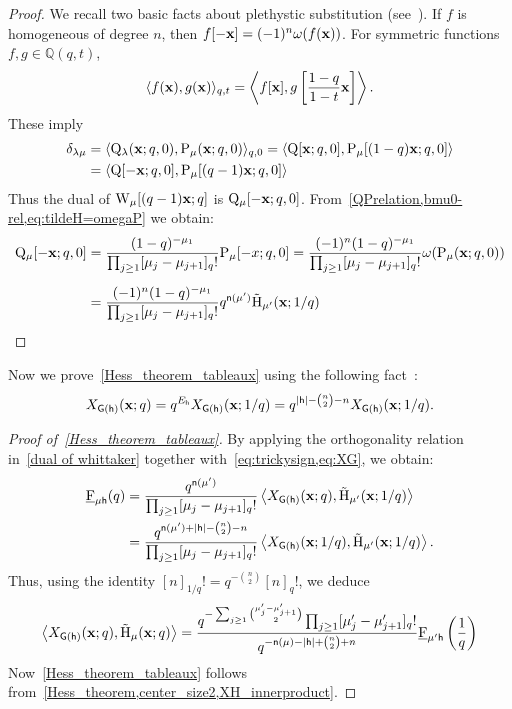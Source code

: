 \documentclass[12pt,a4paper,reqno]{amsart}
\theoremstyle{plain}
\theoremstyle{definition}
\newcommand{\1}{\mathds{1}}
\renewcommand{\P}{\mathrm{P}}
\newcommand{\F}{\mathrm{F}}
\newcommand{\HH}{\mathrm{H}}
\newcommand{\Q}{\mathrm{Q}}
\newcommand{\W}{\mathrm{W}}
\newcommand{\x}{{\bf x}}
\newcommand{\fn}{\mathsf{n}}
\newcommand{\hes}{\mathsf{h}}
\newcommand{\graph}{\mathsf{G}}
\begin{document}
\begin{proof} We recall two basic facts about plethystic substitution (see~\cite[Section 2]{Haiman}). 
If $f$ is homogeneous of degree $n$, then $f[-\x] = (-1)^n \omega(f(\x))$. For symmetric functions $f,g \in \mathbb{Q}(q,t)$,
$$
\langle f(\x), g(\x) \rangle_{q,t}
=
\left\langle f[\x], g\left[\frac{1-q}{1-t}\x\right] \right\rangle.
$$
These imply
\begin{equation*}
\begin{split}
\delta_{\lambda\mu}&=\langle\Q_{\lambda}(\x;q,0),\P_\mu(\x;q,0)\rangle_{q,0}=\langle \Q[\x;q,0], \P_\mu[(1-q)\x;q,0]\rangle\\
&=\langle \Q[-\x;q,0], \P_\mu[(q-1)\x;q,0]\rangle
\end{split}
\end{equation*}
Thus the dual of $\W_\mu[(q-1)\x;q]$ is $\Q_\mu[-\x;q,0]$. From~\cref{QPrelation,bmu0-rel,eq:tildeH=omegaP} we obtain:
\begin{equation*}
\begin{split}
\Q_\mu[-\x;q,0]&=\frac{(1-q)^{-\mu_1}}{\prod_{j\geq 1}[\mu_j-\mu_{j+1}]_q!}\P_\mu[-x;q,0]=\frac{(-1)^n(1-q)^{-\mu_1}}{\prod_{j\geq 1}[\mu_j-\mu_{j+1}]_q!}\omega(\P_\mu(\x;q,0))\\[0.2cm]
&=\frac{(-1)^n(1-q)^{-\mu_1}}{\prod_{j\geq 1}[\mu_j-\mu_{j+1}]_q!}q^{\fn(\mu')}\tilde{\HH}_{\mu'}(\x;1/q)
\qedhere\end{split}
\end{equation*}
\end{proof}
Now we prove~\cref{Hess_theorem_tableaux} using the following fact~\cite[Proposition 2.6]{Shareshian-Wachs}:
\begin{equation}\label{eq:XG}
X_{\graph(\hes)}(\x;q)=q^{E_\hes}X_{\graph(\hes)}(\x;1/q)=q^{|\hes|-\binom{n}{2}-n}X_{\graph(\hes)}(\x;1/q).
\end{equation}
\begin{proof}[Proof of~\cref{Hess_theorem_tableaux}] By applying the orthogonality relation in~\cref{dual of whittaker} together with~\cref{eq:trickysign,eq:XG}, we obtain:
\begin{equation}
\begin{split}
\underline{\F}_{\mu\hes}(q)&=\frac{q^{\fn(\mu')}}{\prod_{j\geq 1}[\mu_j-\mu_{j+1}]_q!}\left\langle X_{\graph(\hes)}(\x;q),\tilde{\HH}_{\mu'}(\x;1/q)\right\rangle\\
&=\frac{q^{\fn(\mu')+|\hes|-\binom{n}{2}-n}}{\prod_{j\geq 1}[\mu_j-\mu_{j+1}]_q!}\left\langle X_{\graph(\hes)}(\x;1/q),\tilde{\HH}_{\mu'}(\x;1/q)\right\rangle.
\end{split}
\end{equation}
Thus, using the identity $[n]_{1/q}! = q^{-\binom{n}{2}} [n]_q!$, we deduce
\begin{equation}\label{XH_innerproduct}
\left\langle X_{\graph(\hes)}(\x;q),\tilde{\HH}_{\mu}(\x;q)\right\rangle=\frac{q^{-\sum_{j\geq 1}\binom{\mu_j'-\mu'_{j+1}}{2}}\prod_{j\geq 1}[\mu_j'-\mu_{j+1}']_q!}{q^{-\fn(\mu)-|\hes|+\binom{n}{2}+n}}\underline{\F}_{\mu'\hes}\left(\frac{1}{q}\right)
\end{equation}
Now~\cref{Hess_theorem_tableaux} follows from~\cref{Hess_theorem,center_size2,XH_innerproduct}.
\end{proof} 
\end{document}
